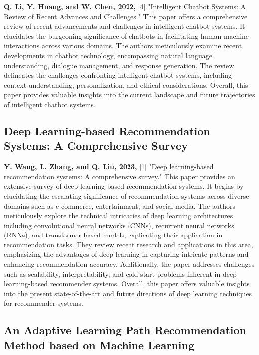 \textbf{Q. Li, Y. Huang, and W. Chen, 2022,} [4] "Intelligent Chatbot Systems: A Review of Recent Advances and Challenges." This paper offers a comprehensive review of recent advancements and challenges in intelligent chatbot systems. It elucidates the burgeoning significance of chatbots in facilitating human-machine interactions across various domains. The authors meticulously examine recent developments in chatbot technology, encompassing natural language understanding, dialogue management, and response generation. The review delineates the challenges confronting intelligent chatbot systems, including context understanding, personalization, and ethical considerations. Overall, this paper provides valuable insights into the current landscape and future trajectories of intelligent chatbot systems.

\subsection{Deep Learning-based Recommendation Systems: A Comprehensive Survey}

\textbf{Y. Wang, L. Zhang, and Q. Liu, 2023,} [1] "Deep learning-based recommendation systems: A comprehensive survey." This paper provides an extensive survey of deep learning-based recommendation systems. It begins by elucidating the escalating significance of recommendation systems across diverse domains such as e-commerce, entertainment, and social media. The authors meticulously explore the technical intricacies of deep learning architectures including convolutional neural networks (CNNs), recurrent neural networks (RNNs), and transformer-based models, explicating their application in recommendation tasks. They review recent research and applications in this area, emphasizing the advantages of deep learning in capturing intricate patterns and enhancing recommendation accuracy. Additionally, the paper addresses challenges such as scalability, interpretability, and cold-start problems inherent in deep learning-based recommender systems. Overall, this paper offers valuable insights into the present state-of-the-art and future directions of deep learning techniques for recommender systems.

\subsection{An Adaptive Learning Path Recommendation Method based on Machine Learning}

